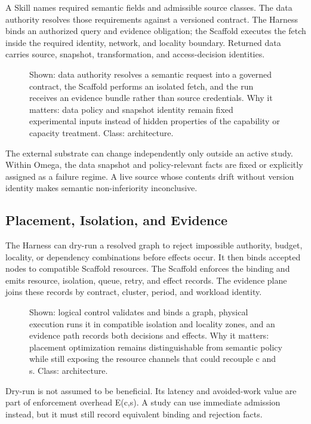 A Skill names required semantic fields and admissible source classes. The data authority resolves those requirements against a versioned contract. The Harness binds an authorized query and evidence obligation; the Scaffold executes the fetch inside the required identity, network, and locality boundary. Returned data carries source, snapshot, transformation, and access-decision identities.

\begin{figure}[t]
\centering
\caption{Shown: data authority resolves a semantic request into a governed contract, the Scaffold performs an isolated fetch, and the run receives an evidence bundle rather than source credentials. Why it matters: data policy and snapshot identity remain fixed experimental inputs instead of hidden properties of the capability or capacity treatment. Class: architecture.}
\label{fig:external-data}
\end{figure}

The external substrate can change independently only outside an active study. Within Omega, the data snapshot and policy-relevant facts are fixed or explicitly assigned as a failure regime. A live source whose contents drift without version identity makes semantic non-inferiority inconclusive.

\subsection{Placement, Isolation, and Evidence}

The Harness can dry-run a resolved graph to reject impossible authority, budget, locality, or dependency combinations before effects occur. It then binds accepted nodes to compatible Scaffold resources. The Scaffold enforces the binding and emits resource, isolation, queue, retry, and effect records. The evidence plane joins these records by contract, cluster, period, and workload identity.

\begin{figure}[t]
\centering
\caption{Shown: logical control validates and binds a graph, physical execution runs it in compatible isolation and locality zones, and an evidence path records both decisions and effects. Why it matters: placement optimization remains distinguishable from semantic policy while still exposing the resource channels that could recouple c and s. Class: architecture.}
\label{fig:dry-run}
\end{figure}

Dry-run is not assumed to be beneficial. Its latency and avoided-work value are part of enforcement overhead E(c,s). A study can use immediate admission instead, but it must still record equivalent binding and rejection facts.

